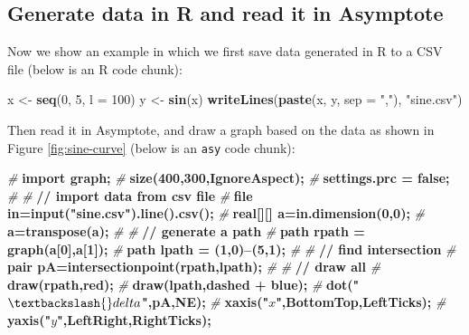 \documentclass[
  11pt,
]{krantz}
\newenvironment{Shaded}{\begin{snugshade}}{\end{snugshade}}
\newcommand{\DataTypeTok}[1]{\textcolor[rgb]{0.27,0.27,0.27}{#1}}
\newcommand{\DecValTok}[1]{\textcolor[rgb]{0.06,0.06,0.06}{#1}}
\newcommand{\ErrorTok}[1]{\textcolor[rgb]{0.14,0.14,0.14}{\textbf{#1}}}
\newcommand{\KeywordTok}[1]{\textcolor[rgb]{0.27,0.27,0.27}{\textbf{#1}}}
\newcommand{\NormalTok}[1]{#1}
\newcommand{\PreprocessorTok}[1]{\textcolor[rgb]{0.37,0.37,0.37}{\textit{#1}}}
\newcommand{\StringTok}[1]{\textcolor[rgb]{0.5,0.5,0.5}{#1}}
\begin{document}
\hypertarget{generate-data-in-r-and-read-it-in-asymptote}{%
\subsection{Generate data in R and read it in Asymptote}\label{generate-data-in-r-and-read-it-in-asymptote}}

Now we show an example in which we first save data generated in R to a CSV file (below is an R code chunk):

\begin{Shaded}
\begin{Highlighting}[]
\NormalTok{x <-}\StringTok{ }\KeywordTok{seq}\NormalTok{(}\DecValTok{0}\NormalTok{, }\DecValTok{5}\NormalTok{, }\DataTypeTok{l =} \DecValTok{100}\NormalTok{)}
\NormalTok{y <-}\StringTok{ }\KeywordTok{sin}\NormalTok{(x)}
\KeywordTok{writeLines}\NormalTok{(}\KeywordTok{paste}\NormalTok{(x, y, }\DataTypeTok{sep =} \StringTok{","}\NormalTok{), }\StringTok{"sine.csv"}\NormalTok{)}
\end{Highlighting}
\end{Shaded}

Then read it in Asymptote, and draw a graph based on the data as shown in Figure \ref{fig:sine-curve} (below is an \texttt{asy} code chunk):

\begin{Shaded}
\begin{Highlighting}[]
\PreprocessorTok{# }\ErrorTok{import graph;}
\PreprocessorTok{# }\ErrorTok{size(400,300,IgnoreAspect);}
\PreprocessorTok{# }\ErrorTok{settings.prc = false;}
\PreprocessorTok{#}\ErrorTok{ }
\PreprocessorTok{# }\ErrorTok{// import data from csv file}
\PreprocessorTok{# }\ErrorTok{file in=input("sine.csv").line().csv();}
\PreprocessorTok{# }\ErrorTok{real[][] a=in.dimension(0,0);}
\PreprocessorTok{# }\ErrorTok{a=transpose(a);}
\PreprocessorTok{#}\ErrorTok{ }
\PreprocessorTok{# }\ErrorTok{// generate a path}
\PreprocessorTok{# }\ErrorTok{path rpath = graph(a[0],a[1]);}
\PreprocessorTok{# }\ErrorTok{path lpath = (1,0)--(5,1);}
\PreprocessorTok{#}\ErrorTok{ }
\PreprocessorTok{# }\ErrorTok{// find intersection}
\PreprocessorTok{# }\ErrorTok{pair pA=intersectionpoint(rpath,lpath);}
\PreprocessorTok{#}\ErrorTok{ }
\PreprocessorTok{# }\ErrorTok{// draw all}
\PreprocessorTok{# }\ErrorTok{draw(rpath,red);}
\PreprocessorTok{# }\ErrorTok{draw(lpath,dashed + blue);}
\PreprocessorTok{# }\ErrorTok{dot("$\textbackslash{}delta$",pA,NE);}
\PreprocessorTok{# }\ErrorTok{xaxis("$x$",BottomTop,LeftTicks);}
\PreprocessorTok{# }\ErrorTok{yaxis("$y$",LeftRight,RightTicks);}
\end{Highlighting}
\end{Shaded}
\end{document}
